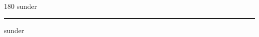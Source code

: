 
\begin{frame}
\begin{center}
\begin{turn}{180}
{\fontsize{2.5cm}{1em}\selectfont sunder}
\end{turn}
\vspace{1em}\par  
\hrule
\vspace{1em}\par  
{\fontsize{2.5cm}{1em}\selectfont sunder}
\end{center}
\end{frame}
